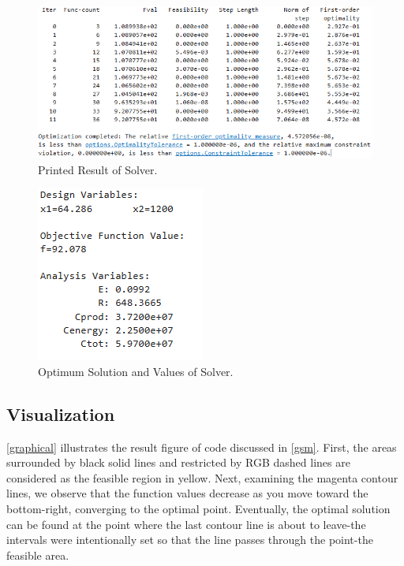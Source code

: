\documentclass[11pt,twocolumn]{article}
\begin{document}
            \begin{figure}[h]
                \centering
                \includegraphics[width=.8\columnwidth]{matlabDisplay.png}
                \caption{Printed Result of Solver.}
                \label{disp}
            \end{figure}

            \begin{figure}[h]
                \centering
                \includegraphics[width=.8\columnwidth]{disp.png}
                \caption{Optimum Solution and Values of Solver.}
                \label{disp2}
            \end{figure}

        \subsection{Visualization}
            \label{vis}
                \cref{graphical} illustrates the result figure of code discussed in \cref{gsm}.
                First, the areas surrounded by black solid lines and restricted by RGB dashed lines are considered as the feasible region in yellow.
                Next, examining the magenta contour lines, we observe that the function values decrease as you move toward the bottom-right, converging to the optimal point.
                Eventually, the optimal solution can be found at the point where the last contour line is about to leave-the intervals were intentionally set so that the line passes through the point-the feasible area.
\end{document}
